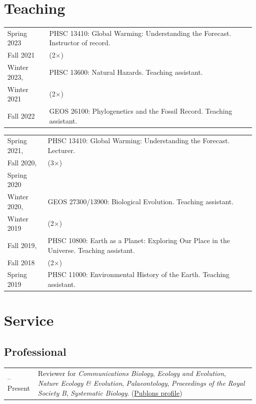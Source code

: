 \documentclass[10pt]{article}
\begin{document}
\section*{Teaching}

\begin{tabularx}{\textwidth}{>{\raggedleft\arraybackslash}p{2.2cm} X}
Spring 2023 & PHSC 13410: Global Warming: Understanding the Forecast. Instructor of record. \\
Fall 2021 & (2$\times$) \\[0.15cm]
Winter 2023, & PHSC 13600: Natural Hazards. Teaching assistant. \\
Winter 2021 & (2$\times$) \\[0.15cm]
Fall 2022 & GEOS 26100: Phylogenetics and the Fossil Record. Teaching assistant.
\end{tabularx}

\newpage

\noindent \begin{tabularx}{\textwidth}{>{\raggedleft\arraybackslash}p{2.2cm} X}
Spring 2021, & PHSC 13410: Global Warming: Understanding the Forecast. Lecturer. \\
Fall 2020, & (3$\times$) \\
Spring 2020 & \\[0.15cm]
Winter 2020, & GEOS 27300/13900: Biological Evolution. Teaching assistant. \\
Winter 2019 & (2$\times$) \\[0.15cm]
Fall 2019, & PHSC 10800: Earth as a Planet: Exploring Our Place in the Universe. Teaching assistant. \\
Fall 2018 & (2$\times$) \\[0.15cm]
Spring 2019 & PHSC 11000: Environmental History of the Earth. Teaching assistant.
\end{tabularx}

\section*{Service}

\subsection*{Professional}

\begin{tabularx}{\textwidth}{>{\raggedleft\arraybackslash}p{2.2cm} X}
2019--Present & Reviewer for \textit{Communications Biology}, \textit{Ecology and Evolution}, \textit{Nature Ecology \& Evolution}, \textit{Palaeontology}, \textit{Proceedings of the Royal Society B}, \textit{Systematic Biology}. (\href{https://publons.com/a/3033367}{Publons profile})
\end{tabularx}
\end{document}
